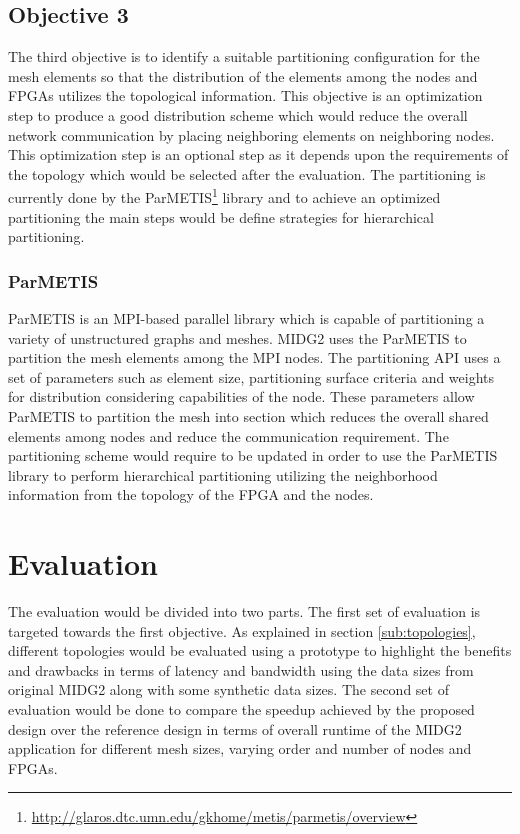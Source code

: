\documentclass[english,notitlepage]{hgbreport}
\begin{document}
\subsection{Objective 3}

The third objective is to identify a suitable partitioning configuration for the mesh elements so that
the distribution of the elements among the nodes and FPGAs utilizes the topological information. 
This objective is an optimization step to produce a good distribution scheme which would reduce
the overall network communication by placing neighboring elements on neighboring nodes. This optimization
step is an optional step as it depends upon the requirements of the topology which would be selected after the
evaluation. The partitioning is currently done by the ParMETIS\footnote{\url{http://glaros.dtc.umn.edu/gkhome/metis/parmetis/overview}}
library and to achieve an optimized partitioning the main steps would be define strategies for hierarchical partitioning.

\subsubsection{ParMETIS}

ParMETIS is an MPI-based parallel library which is capable of partitioning a variety of unstructured graphs and meshes. MIDG2
uses the ParMETIS to partition the mesh elements among the MPI nodes. The partitioning API uses a set of parameters such as element
size, partitioning surface criteria and weights for distribution considering capabilities of the node. These parameters allow
ParMETIS to partition the mesh into section which reduces the overall shared elements among nodes and reduce the communication requirement.
The partitioning scheme would require to be updated in order to use the ParMETIS library to perform hierarchical partitioning
utilizing the neighborhood information from the topology of the FPGA and the nodes.

\section{Evaluation}

The evaluation would be divided into two parts. The first set of evaluation is targeted towards the first objective.
As explained in section \ref{sub:topologies}, different topologies would be evaluated using a prototype to highlight the benefits
and drawbacks in terms of latency and bandwidth using the data sizes from original MIDG2 along with some
synthetic data sizes. The second set of evaluation would be done to compare the speedup achieved by the proposed
design over the reference design in terms of overall runtime of the MIDG2 application for different mesh
sizes, varying order and number of nodes and FPGAs.  
\end{document}
